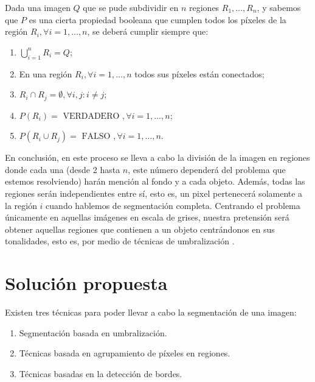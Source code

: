 \begin{definition}\label{def:definicionproblema}
Dada una imagen $Q$ que se pude subdividir en $n$ regiones $R_{1}, \dots, R_{n}$, y sabemos que $P$ es una cierta propiedad booleana que cumplen todos los píxeles de la región $R_{i}, \forall  i=1,\dots ,n$, se deberá cumplir siempre que:
\begin{enumerate}
	\item $\bigcup_{i=1}^{n}R_{i}=Q$;
	\item En una región $R_{i}, \forall i=1,\dots ,n$ todos sus píxeles están conectados;
	\item $R_{i}\cap R_{j}=\emptyset, \forall i, j : i\neq j;$
	\item $P(R_{i}) = \text{ VERDADERO }, \forall  i=1,\dots ,n;$
	\item $P(R_{i}\cup R_{j}) = \text{ FALSO }, \forall  i=1,\dots ,n.$
\end{enumerate}
\end{definition}

En conclusión, en este proceso se lleva a cabo la división de la imagen en regiones donde cada una (desde 2 hasta $n$, este número dependerá del problema que estemos resolviendo) harán mención al fondo y a cada objeto. Además, todas las regiones serán independientes entre sí, esto es, un pixel pertenecerá solamente a la región $i$ cuando hablemos de segmentación completa. Centrando el problema únicamente en aquellas imágenes en escala de grises, nuestra pretensión será obtener aquellas regiones que contienen a un objeto centrándonos en sus tonalidades, esto es, por medio de técnicas de umbralización .


\section{Solución propuesta}\label{sec:solucion}

Existen tres técnicas para poder llevar a cabo la segmentación de una imagen:
\begin{enumerate}[label=\alph*)]
	\item Segmentación basada en umbralización.
	\item Técnicas basada en agrupamiento de píxeles en regiones.
	\item Técnicas basadas en la detección de bordes.
\end{enumerate}

